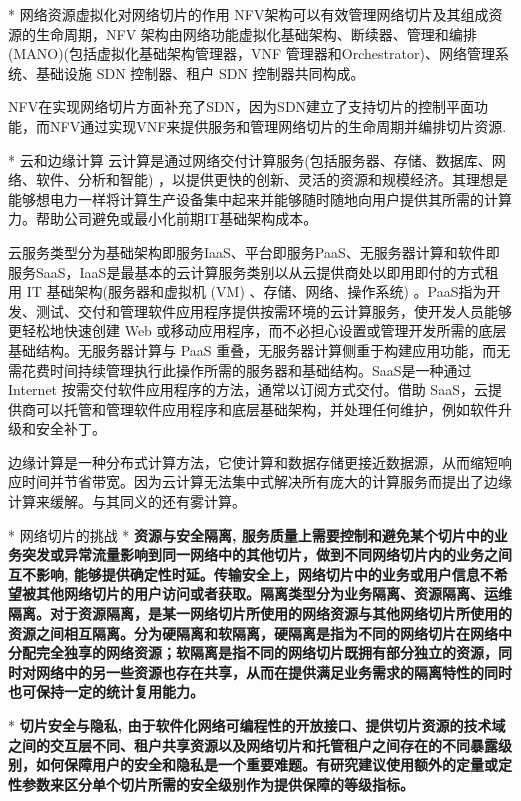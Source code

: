 		* 网络资源虚拟化对网络切片的作用
			NFV架构可以有效管理网络切片及其组成资源的生命周期，NFV 架构由网络功能虚拟化基础架构、断续器、管理和编排(MANO)(包括虚拟化基础架构管理器，VNF 管理器和Orchestrator)、网络管理系统、基础设施 SDN 控制器、租户 SDN 控制器共同构成。
			
			NFV在实现网络切片方面补充了SDN，因为SDN建立了支持切片的控制平面功能，而NFV通过实现VNF来提供服务和管理网络切片的生命周期并编排切片资源.

	* 云和边缘计算
		云计算是通过网络交付计算服务(包括服务器、存储、数据库、网络、软件、分析和智能) ，以提供更快的创新、灵活的资源和规模经济。其理想是能够想电力一样将计算生产设备集中起来并能够随时随地向用户提供其所需的计算力。帮助公司避免或最小化前期IT基础架构成本。

		云服务类型分为基础架构即服务IaaS、平台即服务PaaS、无服务器计算和软件即服务SaaS，IaaS是最基本的云计算服务类别以从云提供商处以即用即付的方式租用 IT 基础架构(服务器和虚拟机 (VM) 、存储、网络、操作系统) 。PaaS指为开发、测试、交付和管理软件应用程序提供按需环境的云计算服务，使开发人员能够更轻松地快速创建 Web 或移动应用程序，而不必担心设置或管理开发所需的底层基础结构。无服务器计算与 PaaS 重叠，无服务器计算侧重于构建应用功能，而无需花费时间持续管理执行此操作所需的服务器和基础结构。SaaS是一种通过 Internet 按需交付软件应用程序的方法，通常以订阅方式交付。借助 SaaS，云提供商可以托管和管理软件应用程序和底层基础架构，并处理任何维护，例如软件升级和安全补丁。

		边缘计算是一种分布式计算方法，它使计算和数据存储更接近数据源，从而缩短响应时间并节省带宽。因为云计算无法集中式解决所有庞大的计算服务而提出了边缘计算来缓解。与其同义的还有雾计算。


* 网络切片的挑战
	* \bf{资源与安全隔离}, 服务质量上需要控制和避免某个切片中的业务突发或异常流量影响到同一网络中的其他切片，做到不同网络切片内的业务之间互不影响, 能够提供确定性时延。传输安全上，网络切片中的业务或用户信息不希望被其他网络切片的用户访问或者获取。隔离类型分为业务隔离、资源隔离、运维隔离。对于资源隔离，是某一网络切片所使用的网络资源与其他网络切片所使用的资源之间相互隔离。分为硬隔离和软隔离，硬隔离是指为不同的网络切片在网络中分配完全独享的网络资源；软隔离是指不同的网络切片既拥有部分独立的资源，同时对网络中的另一些资源也存在共享，从而在提供满足业务需求的隔离特性的同时也可保持一定的统计复用能力。

	* \bf{切片安全与隐私}, 由于软件化网络可编程性的开放接口、提供切片资源的技术域之间的交互层不同、租户共享资源以及网络切片和托管租户之间存在的不同暴露级别，如何保障用户的安全和隐私是一个重要难题。有研究建议使用额外的定量或定性参数来区分单个切片所需的安全级别作为提供保障的等级指标。


